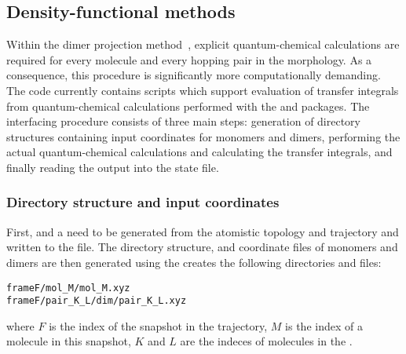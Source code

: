 \subsection{Density-functional methods}
\label{sec:dft}

Within the dimer projection method~\cite{valeev_effect_2006,baumeier_density-functional_2010}, explicit quantum-chemical calculations are required for every molecule and every hopping pair in the morphology. As a consequence, this procedure is significantly more computationally demanding. The code currently contains scripts which support evaluation of transfer integrals from quantum-chemical calculations performed with the \gaussian and \turbomole packages. The interfacing procedure consists of three main steps: generation of directory structures containing input coordinates for monomers and dimers, performing the actual quantum-chemical calculations and calculating the transfer integrals, and finally reading the output into the state file.

\subsubsection{Directory structure and input coordinates}
First,  and a  need to be generated from the atomistic topology and trajectory and written to the \sqlstate file. The directory structure, and coordinate files of monomers and dimers are then generated using the  \calculator
\label{sec:pairdump}
\vskip 0.1cm
{\noindent \small \ctprun \opt \xmloptions \sqlstate \exe {} }
\vskip 0.1cm
 creates the following directories and files:
\begin{verbatim}
frameF/mol_M/mol_M.xyz
frameF/pair_K_L/dim/pair_K_L.xyz
\end{verbatim}
where $F$ is the index of the snapshot in the trajectory, $M$ is the index of a molecule in this snapshot, $K$ and $L$ are the indeces of molecules in the .  

